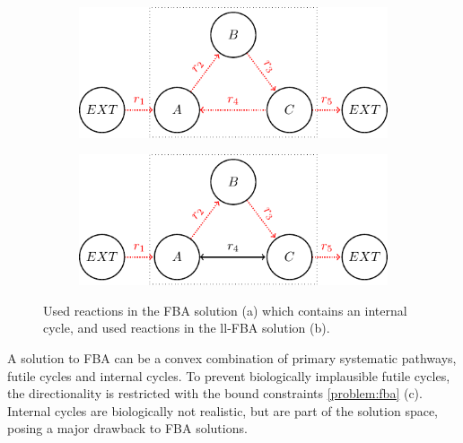 \begin{figure}[H]
    \centering
    \label{fig:loop_solutions}
    \begin{subfigure}{0.5\textwidth}
    \centering
        \includegraphics[width=0.99\linewidth]{Images/tikz_graphs_one_loop_fba.pdf}
        \caption{}
    \end{subfigure}%
    \begin{subfigure}{0.5\textwidth}
    \centering
        \includegraphics[width=0.99\linewidth]{Images/tikz_graphs_one_loop_ll_fba.pdf}
        \caption{}
    \end{subfigure}
    \caption{Used reactions in the \textsf{FBA} solution (a) which contains an internal cycle, and used reactions in the \textsf{ll-FBA} solution (b).}
\end{figure}

A solution to \textsf{FBA} can be a convex combination of primary systematic pathways, futile cycles and internal cycles. To prevent biologically implausible futile cycles, the directionality is restricted with the bound constraints \cref{problem:fba} (c). Internal cycles are biologically not realistic, but are part of the solution space, posing a major drawback to \textsf{FBA} solutions. 


